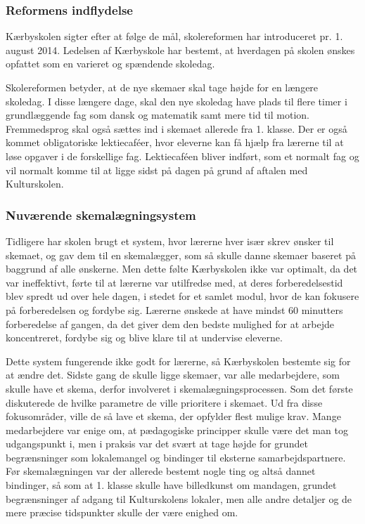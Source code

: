 \subsubsection{Reformens indflydelse}
\label{Reformens_indflydelse}
Kærbyskolen sigter efter at følge de mål, skolereformen har introduceret pr. 1. august 2014. Ledelsen af Kærbyskole har bestemt, at hverdagen på skolen ønskes opfattet som en varieret og spændende skoledag.

Skolereformen betyder, at de nye skemaer skal tage højde for en længere skoledag. I disse længere dage, skal den nye skoledag have plads til flere timer i grundlæggende fag som dansk og matematik samt mere tid til motion. Fremmedsprog skal også sættes ind i skemaet allerede fra 1. klasse. Der er også kommet obligatoriske lektiecaf\'eer, hvor eleverne kan få hjælp fra lærerne til at løse opgaver i de forskellige fag. Lektiecaf\'een bliver indført, som et normalt fag og vil normalt komme til at ligge sidst på dagen på grund af aftalen med Kulturskolen\cite{kaerby_skolereform}.

\subsubsection {Nuværende skemalægningsystem}
Tidligere har skolen brugt et system, hvor lærerne hver især skrev ønsker til skemaet, og gav dem til en skemalægger, som så skulle danne skemaer baseret på baggrund af alle ønskerne. Men dette følte Kærbyskolen ikke var optimalt, da det var ineffektivt, førte til at lærerne var utilfredse med, at deres forberedelsestid blev spredt ud over hele dagen, i stedet for et samlet modul, hvor de kan fokusere på forberedelsen og fordybe sig\cite{interview_Kaerby}. Lærerne ønskede at have mindst 60 minutters forberedelse af gangen, da det giver dem den bedste mulighed for at arbejde koncentreret, fordybe sig og blive klare til at undervise eleverne.

Dette system fungerende ikke godt for lærerne, så Kærbyskolen bestemte sig for at ændre det. Sidste gang de skulle ligge skemaer, var alle medarbejdere, som skulle have et skema, derfor involveret i skemalægningsprocessen. Som det første diskuterede de hvilke parametre de ville prioritere i skemaet. Ud fra disse fokusområder, ville de så lave et skema, der opfylder flest mulige krav. Mange medarbejdere var enige om, at pædagogiske principper skulle være det man tog udgangspunkt i, men i praksis var det svært at tage højde for grundet begrænsninger som lokalemangel og bindinger til eksterne samarbejdspartnere. Før skemalægningen var der allerede bestemt nogle ting og altså dannet bindinger, så som at 1. klasse skulle have billedkunst om mandagen, grundet begrænsninger af adgang til Kulturskolens lokaler, men alle andre detaljer og de mere præcise tidspunkter skulle der være enighed om. 

